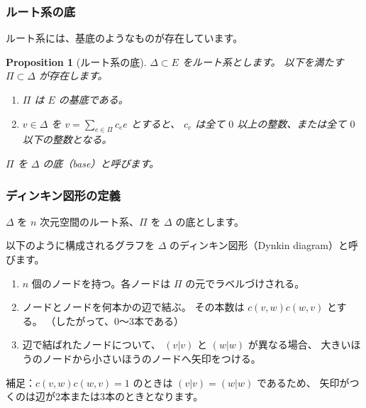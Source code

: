 \documentclass{beamer}
\newtheorem{proposition}{Proposition}
\begin{document}
\begin{frame}
    \frametitle{ルート系の底}

    ルート系には、基底のようなものが存在しています。

    \begin{proposition}[ルート系の底]
        \(\Delta \subset E\) をルート系とします。
        以下を満たす \(\Pi \subset \Delta \) が存在します。

        \begin{enumerate}
            \item \(\Pi \) は \(E\) の基底である。
            \item \(v \in \Delta \) を \(v = \sum_{e \in \Pi} c_e e\) とすると、
                  \(c_e\) は全て \(0\) 以上の整数、または全て \(0\) 以下の整数となる。
        \end{enumerate}

        \(\Pi \) を \(\Delta \) の底（base）と呼びます。
    \end{proposition}
\end{frame}

\begin{frame}
    \frametitle{ディンキン図形の定義}

    \begin{definition}[ディンキン図形]
        \(\Delta \) を \(n\) 次元空間のルート系、\(\Pi \) を \(\Delta \) の底とします。

        以下のように構成されるグラフを \(\Delta \) のディンキン図形（Dynkin diagram）と呼びます。

        \begin{enumerate}
            \item \(n\) 個のノードを持つ。各ノードは \(\Pi \) の元でラベルづけされる。
            \item ノードとノードを何本かの辺で結ぶ。
                  その本数は \(c(v,w) c(w,v)\) とする。
                  （したがって、0〜3本である）
            \item 辺で結ばれたノードについて、
                  \((v|v)\) と \((w|w)\) が異なる場合、
                  大きいほうのノードから小さいほうのノードへ矢印をつける。
        \end{enumerate}

        補足：\(c(v,w) c(w,v) = 1\) のときは \((v|v) = (w|w)\) であるため、
        矢印がつくのは辺が2本または3本のときとなります。
    \end{definition}
\end{frame}
\end{document}
